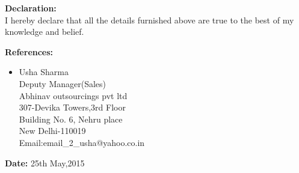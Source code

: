 \documentclass[10pt,a4paper]{article}
\begin{document}
\begin{flushleft}
      \textbf{ Declaration: }\\
     I hereby declare that all the details furnished above are true to the best of my knowledge and belief.
     \medskip
   
   \textbf{ References: }\\
    
    \begin{itemize}
    	\item Usha Sharma\\
    	      Deputy Manager(Sales) \\
    	      Abhinav outsourcings pvt ltd\\
    	      307-Devika Towers,3rd Floor\\
    	      Building No. 6, Nehru place\\
    	      New Delhi-110019\\
    	      Email:email\_2\_usha@yahoo.co.in
    	      
     \end{itemize}
      \textbf{ Date: }25th May,2015\\
	
\end{flushleft}

 
\end{document}
